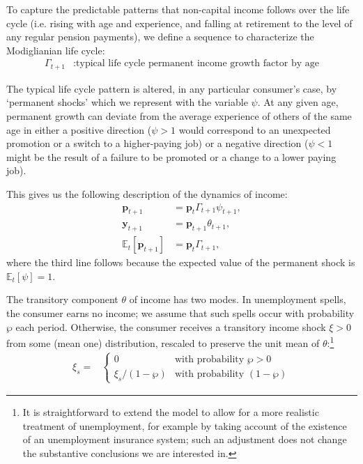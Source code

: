 \documentclass{article}
\newcommand{\yLvl}{\mathbf{y}}
\newcommand{\pLvl}{\mathbf{p}}
\newcommand{\Ex}{\mathbb{E}}
\newcommand{\permGroFac}{\Gamma}
\newcommand{\permShk}{\psi}
\newcommand{\tranShk}{\theta}
\newcommand{\pZero}{\wp}
\newcommand{\tranShkEmp}{\xi}
\begin{document}
To capture the predictable patterns that non-capital income follows over the life cycle (i.e. rising with age and experience, and falling at retirement to the level of any regular pension payments), we define a sequence to characterize the Modiglianian life cycle:
\begin{align}
    \permGroFac_{t+1} & : \text{typical life cycle permanent income growth factor by age}
\end{align}

The typical life cycle pattern is altered, in any particular consumer's case, by `permanent shocks' which we represent with the variable $\permShk$.
At any given age, permanent growth can deviate from the average experience of others of the same age in either a positive direction ($\psi>1$ would correspond to an unexpected promotion or a switch to a higher-paying job) or a negative direction ($\psi < 1$ might be the result of a failure to be promoted or a change to a lower paying job).

This gives us the following description of the dynamics of income:
\begin{align}
    \pLvl_{t+1} & = \pLvl_{t} \permGroFac_{t+1} \permShk_{t+1}, \\
    \yLvl_{t+1} & = \pLvl_{t+1} \tranShk_{t+1}, \\
    \Ex_{t}[\pLvl_{t+1}] & = \pLvl_{t} \permGroFac_{t+1},
\end{align}
where the third line follows because the expected value of the permanent shock is $\Ex_{t}[\permShk]=1$.

The transitory component $\tranShk$ of income has two modes.
In unemployment spells, the consumer earns no income; we assume that such spells occur with probability $\pZero$ each period.
Otherwise, the consumer receives a transitory income shock $\xi > 0$ from some (mean one) distribution, rescaled to preserve the unit mean of $\tranShk$:\footnote{It is straightforward to extend the model to allow for a more realistic treatment of unemployment, for example by taking account of the existence of an unemployment insurance system; such an adjustment does not change the substantive conclusions we are interested in.}
\begin{align}
    \tranShkEmp_{s} = &
    \begin{cases}
        0\phantom{/\pZero} & \text{with probability $\pZero>0$}
        \\ \xi_{s}/(1-\pZero) & \text{with probability $(1-\pZero)$}
    \end{cases}
\end{align}
\end{document}

